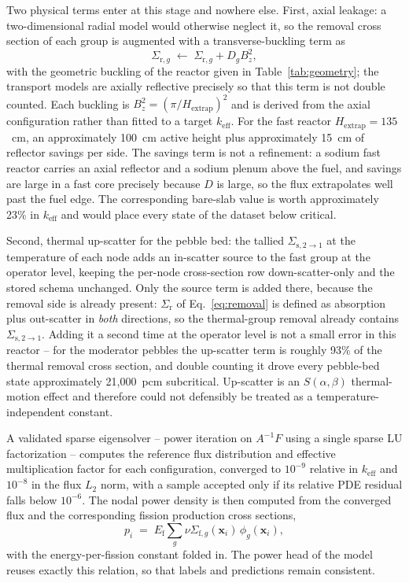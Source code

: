 \documentclass[preprint,12pt]{elsarticle}
\newcommand{\keff}{k_{\mathrm{eff}}}
\newcommand{\Sig}[1]{\Sigma_{\mathrm{#1}}}
\newcommand{\Bz}{B_z^{2}}
\begin{document}
Two physical terms enter at this stage and nowhere else. First, axial leakage:
a two-dimensional radial model would otherwise neglect it, so the removal cross
section of each group is augmented with a transverse-buckling term
\citep{stacey2007} as
\begin{equation}
\Sig{r,\mathit{g}} \;\leftarrow\; \Sig{r,\mathit{g}} + D_g \Bz,
\label{eq:buckling}
\end{equation}
with the geometric buckling of the reactor given in Table~\ref{tab:geometry};
the transport models are axially reflective precisely so that this term is not
double counted. Each buckling is $\Bz = (\pi/H_{\mathrm{extrap}})^2$ and is
derived from the axial configuration rather than fitted to a target $\keff$. For
the fast reactor $H_{\mathrm{extrap}} = 135$~cm, an approximately 100~cm active
height plus approximately 15~cm of reflector savings per side. The savings term
is not a refinement: a sodium fast reactor carries an axial reflector and a
sodium plenum above the fuel, and savings are large in a fast core precisely
because $D$ is large, so the flux extrapolates well past the fuel edge. The
corresponding bare-slab value is worth approximately 23\% in $\keff$ and would
place every state of the dataset below critical.

Second, thermal up-scatter for the pebble bed: the tallied
$\Sigma_{\mathrm{s},2\rightarrow1}$ at the temperature of each node adds an
in-scatter source to the fast group at the operator level, keeping the per-node
cross-section row down-scatter-only and the stored schema unchanged. Only the
source term is added there, because the removal side is already present:
$\Sig{r}$ of Eq.~\eqref{eq:removal} is defined as absorption plus out-scatter in
\emph{both} directions, so the thermal-group removal already contains
$\Sigma_{\mathrm{s},2\rightarrow1}$. Adding it a second time at the operator
level is not a small error in this reactor -- for the moderator pebbles the
up-scatter term is roughly 93\% of the thermal removal cross section, and
double counting it drove every pebble-bed state approximately 21{,}000~pcm
subcritical. Up-scatter is an $S(\alpha,\beta)$ thermal-motion effect and
therefore could not defensibly be treated as a temperature-independent constant.

A validated sparse eigensolver -- power iteration on $A^{-1}F$ using a single
sparse LU factorization -- computes the reference flux distribution and
effective multiplication factor for each configuration, converged to
$10^{-9}$ relative in $\keff$ and $10^{-8}$ in the flux $L_2$ norm, with a
sample accepted only if its relative PDE residual falls below $10^{-6}$. The
nodal power density is then computed from the converged flux and the
corresponding fission production cross sections,
\begin{equation}
p_i \;=\; E_{\mathrm{f}} \sum_{g} \nu\Sigma_{\mathrm{f},g}(\mathbf{x}_i)\,\phi_g(\mathbf{x}_i),
\label{eq:power}
\end{equation}
with the energy-per-fission constant folded in. The power head of the model
reuses exactly this relation, so that labels and predictions remain consistent.
\end{document}
